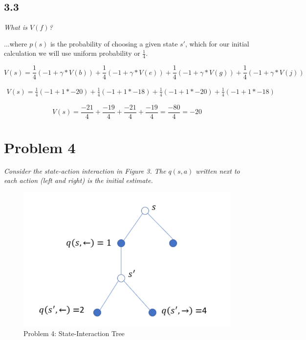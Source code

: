 \documentclass{article}
\begin{document}
\subsection*{3.3}

\textit{What is $V(f)$?}

...where $p(s)$ is the probability of choosing a given state $s'$, which for our initial calculation we will use uniform probability or $\frac{1}{4}$.

\begin{equation}
    V(s) = \frac{1}{4}(-1 + \gamma * V(b)) + \frac{1}{4}(-1 + \gamma * V(e)) + \frac{1}{4}(-1 + \gamma * V(g)) + \frac{1}{4}(-1 + \gamma * V(j))
\end{equation}

\begin{eqnarray}
    V(s) = \frac{1}{4}(-1 + 1 * -20) + \frac{1}{4}(-1 + 1 * -18) + \frac{1}{4}(-1 + 1 * -20) + \frac{1}{4}(-1 + 1 * -18)
\end{eqnarray}

\begin{equation}
    V(s) = \frac{-21}{4} + \frac{-19}{4} + \frac{-21}{4} + \frac{-19}{4} = \frac{-80}{4} = -20
\end{equation}


\section*{Problem 4}

\textit{Consider the state-action interaction in Figure 3. The $q(s,a)$ written next to each action (left and right) is the initial estimate.}

\begin{figure}
    \centering
    \includegraphics[width=.8\linewidth]{imgs/midterm.4.1.png}
    \caption{Problem 4: State-Interaction Tree}
\end{figure}
\end{document}
